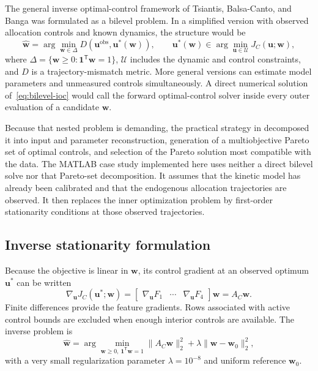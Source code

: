 \documentclass[11pt,a4paper]{article}
\newcommand{\vect}[1]{\boldsymbol{#1}}
\begin{document}
The general inverse optimal-control framework of Tsiantis, Balsa-Canto, and
Banga \cite{Tsiantis2018} was formulated as a bilevel problem. In a simplified
version with observed allocation controls and known dynamics, the structure
would be
\begin{equation}
  \hat{\vect{w}}
  =
  \arg\min_{\vect{w}\in\Delta}
  D\!\left(\vect{u}^{\mathrm{obs}},\vect{u}^{*}(\vect{w})\right),
  \qquad
  \vect{u}^{*}(\vect{w})
  \in
  \arg\min_{\vect{u}\in\mathcal{U}}
  J_C(\vect{u};\vect{w}),
  \label{eq:bilevel-ioc}
\end{equation}
where \(\Delta=\{\vect{w}\ge0:\vect{1}^{\mathsf T}\vect{w}=1\}\),
\(\mathcal{U}\) includes the dynamic and control constraints, and \(D\) is a
trajectory-mismatch metric. More general versions can estimate model
parameters and unmeasured controls simultaneously. A direct numerical
solution of~\eqref{eq:bilevel-ioc} would call the forward optimal-control
solver inside every outer evaluation of a candidate \(\vect{w}\).

Because that nested problem is demanding, the practical strategy in
\cite{Tsiantis2018} decomposed it into input and parameter reconstruction,
generation of a multiobjective Pareto set of optimal controls, and selection
of the Pareto solution most compatible with the data. The MATLAB case study
implemented here uses neither a direct bilevel solve nor that Pareto-set
decomposition. It assumes that the kinetic model has already been calibrated
and that the endogenous allocation trajectories are observed. It then replaces
the inner optimization problem by first-order stationarity conditions at those
observed trajectories.

\subsection{Inverse stationarity formulation}

Because the objective is linear in \(\vect{w}\), its control gradient at an
observed optimum \(\vect{u}^{*}\) can be written
\begin{equation}
  \nabla_{\vect{u}}J_C(\vect{u}^{*};\vect{w})
  =
  \begin{bmatrix}
    \nabla_{\vect{u}}F_1 &
    \cdots &
    \nabla_{\vect{u}}F_4
  \end{bmatrix}
  \vect{w}
  = A_C\vect{w}.
\end{equation}
Finite differences provide the feature gradients. Rows associated with active
control bounds are excluded when enough interior controls are available. The
inverse problem is
\begin{equation}
  \hat{\vect{w}} =
  \arg\min_{\vect{w}\ge0,\ \vect{1}^{\mathsf T}\vect{w}=1}
  \|A_C\vect{w}\|_2^2
  +\lambda\|\vect{w}-\vect{w}_0\|_2^2,
\end{equation}
with a very small regularization parameter
\(\lambda=10^{-8}\) and uniform reference \(\vect{w}_0\).
\end{document}
